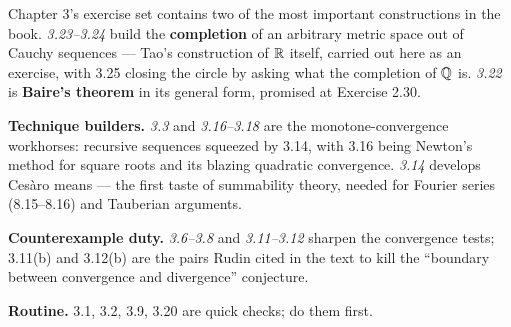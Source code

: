
\begin{roadmap}
Chapter 3's exercise set contains two of the most important constructions in
the book. \emph{3.23--3.24} build the \textbf{completion} of an arbitrary
metric space out of Cauchy sequences --- Tao's construction of $\mathbb{R}$ itself,
carried out here as an exercise, with 3.25 closing the circle by asking what
the completion of $\mathbb{Q}$ is. \emph{3.22} is \textbf{Baire's theorem} in its
general form, promised at Exercise 2.30.

\medskip
\raggedright
\textbf{Technique builders.} \emph{3.3} and \emph{3.16--3.18} are the
monotone-convergence workhorses: recursive sequences squeezed by 3.14, with
3.16 being Newton's method for square roots and its blazing quadratic
convergence. \emph{3.14} develops Ces\`aro means --- the first taste of
summability theory, needed for Fourier series (8.15--8.16) and Tauberian
arguments.

\smallskip
\textbf{Counterexample duty.} \emph{3.6--3.8} and \emph{3.11--3.12} sharpen
the convergence tests; 3.11(b) and 3.12(b) are the pairs Rudin cited in the
text to kill the ``boundary between convergence and divergence'' conjecture.

\smallskip
\textbf{Routine.} 3.1, 3.2, 3.9, 3.20 are quick checks; do them first.
\end{roadmap}


